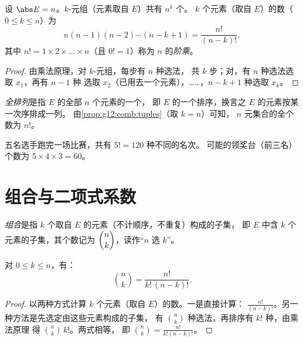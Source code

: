 \begin{proposition}\label{prop:g12:comb:tuples}
设 $\abs E = n$。$k$-元组（元素取自 $E$）共有 $n^k$ 个。
$k$ 个元素（取自 $E$）的数（$0 \leq k \leq n$）为
\[
n(n-1)(n-2)\cdots(n-k+1) = \frac{n!}{(n-k)!},
\]
其中 $n! = 1 \times 2 \times \dots \times n$（且 $0! = 1$）称为
$n$ 的\emph{阶乘}。
\end{proposition}

\begin{proof}
由乘法原理，对 $k$-元组，每步有 $n$ 种选法，
共 $k$ 步；对，有 $n$ 种选法选取 $x_1$，再有 $n - 1$ 种
选取 $x_2$（已用去一个元素），……，$n - k + 1$ 种选取 $x_k$。
\end{proof}

\begin{definition}[全排列]\label{def:g12:comb:permutation}
\emph{全排列}是指 $E$ 的全部 $n$ 个元素的一个，
即 $E$ 的一个排序，换言之 $E$ 的元素按某一次序排成一列。
由\cref{prop:g12:comb:tuples}（取 $k = n$）可知，
$n$ 元集合的全个数为 $n!$。
\end{definition}

\begin{example}
五名选手跑完一场比赛，共有 $5! = 120$ 种不同的名次。
可能的领奖台（前三名）个数为 $5 \times 4 \times 3 = 60$。
\end{example}

\section{组合与二项式系数}

\begin{definition}[组合]\label{def:g12:comb:combination}
\emph{组合}是指 $k$ 个取自 $E$ 的元素（不计顺序，不重复）构成的子集，
即 $E$ 中含 $k$ 个元素的子集，其个数记为
$\dbinom{n}{k}$，读作“$n$ 选 $k$”。
\end{definition}

\begin{theorem}\label{thm:g12:comb:binomformula}
对 $0 \leq k \leq n$，有：
\[
\binom{n}{k} = \frac{n!}{k!\,(n-k)!} .
\]
\end{theorem}

\begin{proof}
以两种方式计算 $k$ 个元素（取自 $E$）的数。一是直接计算：
$\frac{n!}{(n-k)!}$。另一种方法是先选定由这些元素构成的子集，
有 $\binom nk$ 种选法，再排序有 $k!$ 种，由乘法原理
得 $\binom{n}{k}\,k!$。两式相等，
即 $\binom nk = \frac{n!}{k!(n-k)!}$。
\end{proof}

